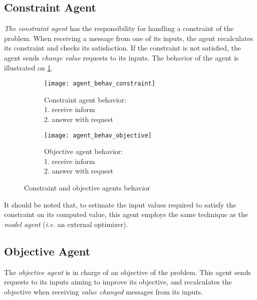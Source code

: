 
\subsection{Constraint Agent}
 \emph{The constraint agent} has the responsibility for handling a constraint of the problem. When receiving a message from one of its inputs, the agent recalculates its constraint and checks its satisfaction. If the constraint is not satisfied, the agent sends \emph{change value} requests to its inputs. The behavior of the agent is illustrated on \figurename{} \ref{agent_behav_constraint}.
 
\begin{figure}
\centering
\begin{subfigure}{0.3\textwidth}
	\texttt{[image: agent\_behav\_constraint]}
	\caption{Constraint agent behavior:\\1. receive inform\\2. answer with request}\label{agent_behav_constraint}
\end{subfigure}
\qquad
\begin{subfigure}{0.3\textwidth}
	\texttt{[image: agent\_behav\_objective]}
	\caption{Objective agent behavior:\\1. receive inform\\2. answer with request}\label{agent_behav_objective}
\end{subfigure}
\caption{Constraint and objective agents behavior}\label{agent_behav_constraint_and_objective}
\end{figure}

It should be noted that, to estimate the input values required to satisfy the constraint on its computed value, this agent employs the same technique as the \emph{model agent} (\textit{i.e.} an external optimizer).

\subsection{Objective Agent}
The \emph{objective agent} is in charge of an objective of the problem. This agent sends requests to its inputs aiming to improve its objective, and recalculates the objective when receiving \emph{value changed} messages from its inputs.

